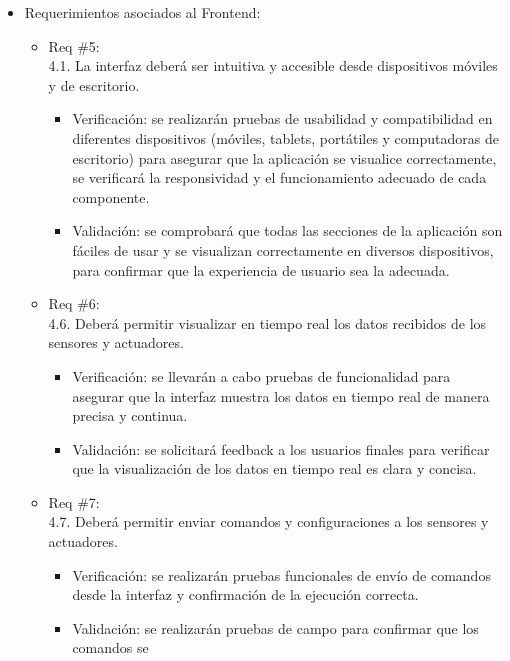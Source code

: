 \begin{itemize}
	\item Requerimientos asociados al Frontend:
	      \begin{itemize}
		      \item Req \#5:\\ 4.1. La interfaz deberá ser intuitiva y accesible desde dispositivos
		            móviles y de escritorio.
		            \begin{itemize}
			            \item Verificación: se realizarán pruebas de usabilidad y compatibilidad en
			                  diferentes dispositivos (móviles, tablets, portátiles y computadoras de
			                  escritorio) para asegurar que la aplicación se visualice correctamente, se
			                  verificará la responsividad y el funcionamiento adecuado de cada componente.
			            \item Validación: se comprobará que todas las secciones de la aplicación son fáciles
			                  de usar y se visualizan correctamente en diversos dispositivos, para confirmar
			                  que la experiencia de usuario sea la adecuada.
		            \end{itemize}
		      \item Req \#6: \\ 4.6. Deberá permitir visualizar en tiempo real los datos recibidos
		            de los sensores y actuadores.
		            \begin{itemize}
			            \item Verificación: se llevarán a cabo pruebas de funcionalidad para asegurar que la
			                  interfaz muestra los datos en tiempo real de manera precisa y continua.
			            \item Validación: se solicitará feedback a los usuarios finales para verificar que la
			                  visualización de los datos en tiempo real es clara y concisa.
		            \end{itemize}
		      \item Req \#7: \\ 4.7. Deberá permitir enviar comandos y configuraciones a los
		            sensores y actuadores.
		            \begin{itemize}
			            \item Verificación: se realizarán pruebas funcionales de envío de comandos desde la
			                  interfaz y confirmación de la ejecución correcta.
			            \item Validación: se realizarán pruebas de campo para confirmar que los comandos se

\end{itemize}
\end{itemize}
\end{itemize}

